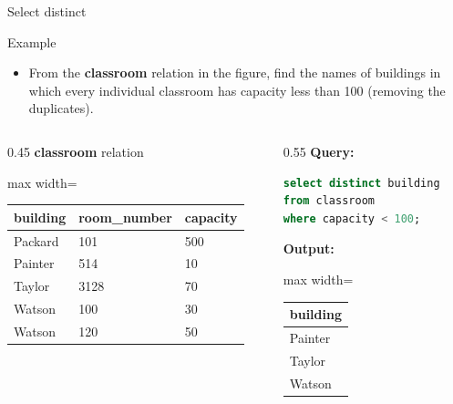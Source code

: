 \documentclass[aspectratio=169, xcolor=dvipsnames]{beamer}
\begin{document}
\begin{frame}[fragile]{Select distinct}
    \begin{exampleblock}{Example}
        \begin{itemize}[<+->]
            \item From the \textbf{classroom} relation in the figure, find the names of buildings in which every individual classroom has capacity less than 100 (removing the duplicates).
        \end{itemize}
    \end{exampleblock}
    \begin{columns}
        \begin{column}{0.45\textwidth}
            \textbf{classroom} relation
            \begin{center}
                \begin{adjustbox}{max width=\textwidth}
                \begin{tabular}{|l|l|l|}
                \hline
                \textbf{building} & \textbf{room\_number} & \textbf{capacity} \\ \hline
                Packard & 101 & 500 \\ \hline
                Painter & 514 & 10 \\ \hline
                Taylor & 3128 & 70 \\ \hline
                Watson & 100 & 30 \\ \hline
                Watson & 120 & 50 \\ \hline
                \end{tabular}
                \end{adjustbox}
            \end{center}
        \end{column}
        \begin{column}{0.55\textwidth}
            \textbf{Query:}
            \begin{lstlisting}[language=SQL]
select distinct building 
from classroom 
where capacity < 100;
            \end{lstlisting}
            \textbf{Output:}
            \begin{center}
                \begin{adjustbox}{max width=\textwidth}
                \begin{tabular}{|l|}
                \hline
                \textbf{building} \\ \hline
                Painter \\ \hline
                Taylor \\ \hline
                Watson \\ \hline
                \end{tabular}
                \end{adjustbox}
            \end{center}
        \end{column}
    \end{columns}
\end{frame}
\end{document}
